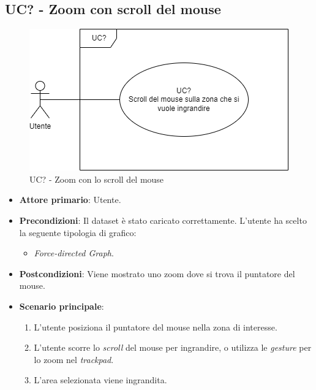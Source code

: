 \subsection{UC? - Zoom con scroll del mouse}
\label{sec:UC?}
\begin{figure}[h!]
    \centering
    \includegraphics[scale=0.55]{../../assets/zoom_mouse.png}
    \caption{UC? - Zoom con lo scroll del mouse}
\end{figure}
\begin{itemize}
    \item \textbf{Attore primario}: Utente.
    \item \textbf{Precondizioni}: Il dataset è stato caricato correttamente. L'utente ha scelto la seguente tipologia di grafico:
    \begin{itemize}
          \item \textit{Force-directed Graph}.
    \end{itemize}
    \item \textbf{Postcondizioni}: Viene mostrato uno zoom dove si trova il puntatore del mouse.
    \item \textbf{Scenario principale}:
          \begin{enumerate}
              \item L'utente posiziona il puntatore del mouse nella zona di interesse.
              \item L'utente scorre lo \textit{scroll} del mouse per ingrandire, o utilizza le \textit{gesture} per lo zoom nel \textit{trackpad}.
              \item L'area selezionata viene ingrandita.
          \end{enumerate}
\end{itemize}

\newpage

